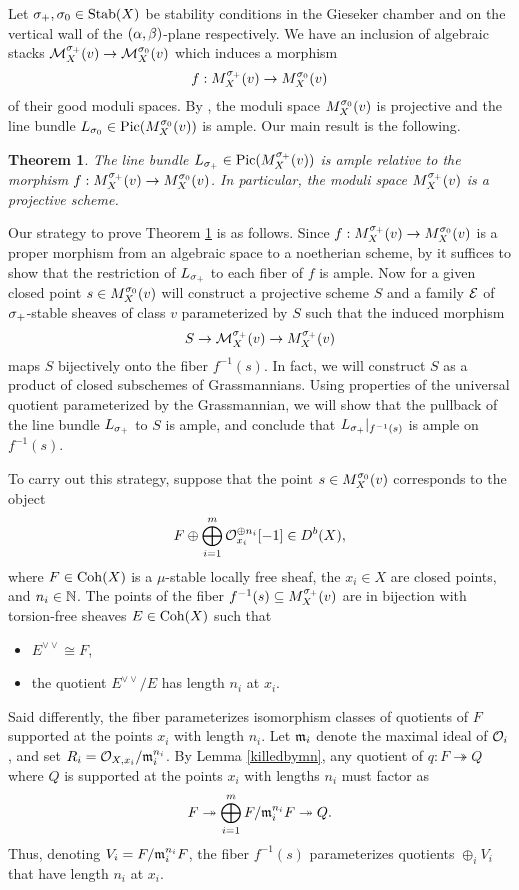 \documentclass[letterpaper,12pt]{amsart}
\newtheorem{thm}{Theorem}[section]
\theoremstyle{remark}
\begin{document}
Let $\sigma_+, \sigma_0 \in \operatorname{\mathrm{Stab}}(X)$ be stability conditions in the Gieseker chamber and on the vertical wall of the $(\alpha,\beta)$-plane respectively. We have an inclusion of algebraic stacks $\mathcal{M}^{\sigma_+}_X(v) \to \mathcal{M}^{\sigma_0}_X(v)$ which induces a morphism
\[ f: M^{\sigma_+}_X(v) \to M^{\sigma_0}_X(v) \]
of their good moduli spaces. By \cite[Theorem 1.1]{t}, the moduli space $M^{\sigma_0}_X(v)$ is projective and the line bundle $L_{\sigma_0} \in \mathrm{Pic}(M^{\sigma_0}_X(v))$ is ample. Our main result is the following.
\begin{thm}\label{giesproj}
    The line bundle $L_{\sigma_+} \in \mathrm{Pic}(M^{\sigma_+}_X(v))$ is ample relative to the morphism $f: M^{\sigma_+}_X(v) \to M^{\sigma_0}_X(v)$. In particular, the moduli space $M^{\sigma_+}_X(v)$ is a projective scheme.
\end{thm}
Our strategy to prove Theorem \ref{giesproj} is as follows. Since $f: M^{\sigma_+}_X(v) \to M^{\sigma_0}_X(v)$ is a proper morphism from an algebraic space to a noetherian scheme, by \cite[\href{https://stacks.math.columbia.edu/tag/0D3A}{Tag 0D3A}]{stacks-project} it suffices to show that the restriction of $L_{\sigma_+}$ to each fiber of $f$ is ample. Now for a given closed point $s \in M^{\sigma_0}_X(v)$ will construct a projective scheme $S$ and a family $\mathcal{E}$ of $\sigma_+$-stable sheaves of class $v$ parameterized by $S$ such that the induced morphism
\[ S \to \mathcal{M}^{\sigma_+}_X(v) \to M^{\sigma_+}_X(v) \]
maps $S$ bijectively onto the fiber $f^{-1}(s)$. In fact, we will construct $S$ as a product of closed subschemes of Grassmannians. Using properties of the universal quotient parameterized by the Grassmannian, we will show that the pullback of the line bundle $L_{\sigma_+}$ to $S$ is ample, and conclude that $L_{\sigma_+}|_{f^{-1}(s)}$ is ample on $f^{-1}(s)$.

To carry out this strategy, suppose that the point $s \in M^{\sigma_0}_X(v)$ corresponds to the object
\[ F \oplus \bigoplus_{i=1}^m \mathcal{O}_{x_i}^{\oplus n_i}[-1] \in D^b(X), \]
where $F \in \mathrm{Coh}(X)$ is a $\mu$-stable locally free sheaf, the $x_i \in X$ are closed points, and $n_i \in \mathbb{N}$. The points of the fiber $f^{-1}(s) \subseteq M^{\sigma_+}_X(v)$ are in bijection with torsion-free sheaves $E \in \mathrm{Coh}(X)$ such that 
\begin{itemize}
    \item $E^{\vee\vee} \cong F$, 
    \item the quotient $E^{\vee\vee}/E$ has length $n_i$ at $x_i$.
\end{itemize}
Said differently, the fiber parameterizes isomorphism classes of quotients of $F$ supported at the points $x_i$ with length $n_i$. Let $\mathfrak{m}_i$ denote the maximal ideal of $\mathcal{O}_i$, and set $R_i = \mathcal{O}_{X,x_i}/\mathfrak{m}_i^{n_i}$. By Lemma \ref{killedbymn}, any quotient of $q: F \twoheadrightarrow Q$ where $Q$ is supported at the points $x_i$ with lengths $n_i$ must factor as
\[ F \twoheadrightarrow \bigoplus_{i=1}^m F/\mathfrak{m}_i^{n_i} F \twoheadrightarrow Q. \]
Thus, denoting $V_i = F/\mathfrak{m}_i^{n_i}F$, the fiber $f^{-1}(s)$ parameterizes quotients $\oplus_i V_i$ that have length $n_i$ at $x_i$. 
\end{document}
